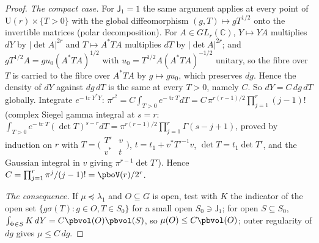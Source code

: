 \documentclass[10pt]{amsart}
\theoremstyle{definition}
\theoremstyle{remark}
\newcommand{\C}{\mathbb C}
\begin{document}
\begin{proof}
\emph{The compact case.} For $\mathsf J_1=1$ the same argument applies at every point of
$\mathrm U(r)\times\{T>0\}$ with the global diffeomorphism $(g,T)\mapsto gT^{1/2}$ onto the invertible
matrices (polar decomposition). For $A\in GL_r(\C)$, $Y\mapsto YA$ multiplies $dY$ by $|\det A|^{2r}$ and
$T\mapsto A^*TA$ multiplies $dT$ by $|\det A|^{2r}$; and $gT^{1/2}A=gu_0(A^*TA)^{1/2}$ with $u_0=T^{1/2}A(A^*TA)^{-1/2}$
unitary, so the fibre over $T$ is carried to the fibre over $A^*TA$ by $g\mapsto gu_0$, which preserves $dg$.
Hence the density of $dY$ against $dg\,dT$ is the same at every $T>0$, namely $C$. So $dY=C\,dg\,dT$ globally. Integrate $e^{-\operatorname{tr}Y^*Y}$: $\pi^{r^2}=C\int_{T>0}
e^{-\operatorname{tr}T}dT=C\,\pi^{r(r-1)/2}\prod_{j=1}^r(j-1)!$ (complex Siegel gamma integral at $s=r$:
$\int_{T>0}e^{-\operatorname{tr}T}(\det T)^{s-r}dT=\pi^{r(r-1)/2}\prod_{j=1}^r\Gamma(s-j+1)$, proved by induction on
$r$ with $T=\bigl(\begin{smallmatrix}T'&v\\v^*&t\end{smallmatrix}\bigr)$, $t=t_1+v^*T'^{-1}v$, $\det T=t_1\det T'$, and
the Gaussian integral in $v$ giving $\pi^{r-1}\det T'$). Hence $C=\prod_{j=1}^r\pi^j/(j-1)!=\pboV(r)/2^r$.

\emph{The consequence.} If $\mu\preceq\lambda_1$ and $O\subseteq G$ is open, test with $K$ the indicator
of the open set $\{g\sigma(T):g\in O,T\in S_0\}$ for a small open $S_0\ni\mathsf J_1$; for open $S\subseteq S_0$,
$\int_{\Phi\in S}K\,dY=C\pbvol(O)\pbvol(S)$, so $\mu(O)\le C\pbvol(O)$; outer regularity of $dg$ gives
$\mu\le C\,dg$.
\end{proof}
\end{document}
